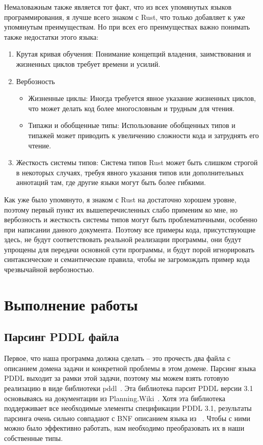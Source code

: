 \documentclass{article}
\begin{document}
Немаловажным также является тот факт, что из всех упомянутых языков программирования,
я лучше всего знаком с Rust, что только добавляет к уже упомянутым преимуществам.
Но при всех его преимуществах важно понимать также недостатки этого языка:

\begin{enumerate}
  \item Крутая кривая обучения: Понимание концепций владения, заимствования и жизненных циклов требует времени и усилий.
  \item Вербозность
    \begin{itemize}
      \item Жизненные циклы: Иногда требуется явное указание жизненных циклов, что может делать код более многословным и трудным для чтения.
      \item Типажи и обобщенные типы: Использование обобщенных типов и типажей может приводить к увеличению сложности кода и затруднять его чтение.
    \end{itemize}
  \item Жесткость системы типов: Система типов Rust может быть слишком строгой в некоторых случаях, требуя явного указания типов или дополнительных аннотаций там, где другие языки могут быть более гибкими.
\end{enumerate}

Как уже было упомянуто, я знаком с Rust на достаточно хорошем уровне,
поэтому первый пункт их вышеперечисленных слабо применим ко мне,
но вербозность и жесткость системы типов могут быть проблематичными,
особенно при написании данного документа.
Поэтому все примеры кода, присутствующие здесь, не будут соответствовать реальной реализации программы,
они будут упрощены для передачи основной сути программы,
и будут порой игнорировать синтаксические и семантические правила,
чтобы не загромождать пример кода чрезвычайной вербозностью.

\newpage

\section{Выполнение работы}

\subsection{Парсинг PDDL файла}

Первое, что наша программа должна сделать -- это прочесть два файла с описанием домена задачи
и конкретной проблемы в этом домене. Парсинг языка PDDL выходит за рамки этой задачи,
поэтому мы можем взять готовую реализацию в виде библиотеки pddl~\cite{pddl-crate}.
Эта библиотека парсит PDDL версии 3.1 основываясь на документации из Planning.Wiki~\cite{planning-wiki}.
Хотя эта библиотека поддерживает все необходимые элементы спецификации PDDL 3.1,
результаты парсинга очень сильно совпадают с BNF описанием языка из ~\cite{pddl-bnf}. 
Чтобы с ними можно было эффективно работать, нам необходимо преобразовать их в наши собственные типы.
\end{document}

